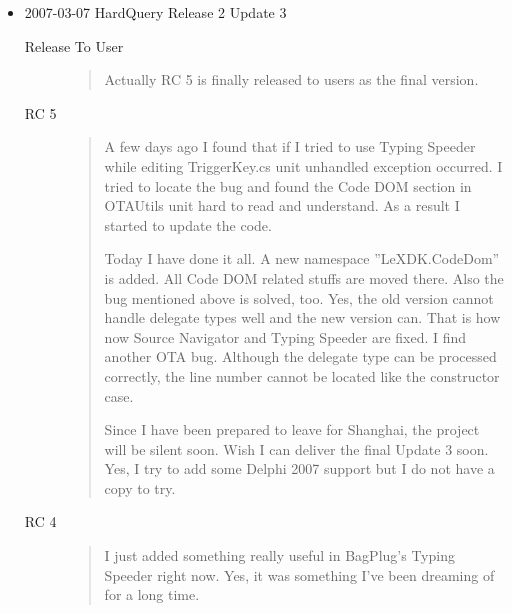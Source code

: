 \begin{itemize}
  \item 2007-03-07 HardQuery Release 2 Update 3
  \begin{description}
	\item[Release To User]
	\begin{quotation}
	Actually RC 5 is finally released to users as the final version.
	\end{quotation}
    \item[RC 5]
    \begin{quotation}
          A few days ago I found that if I tried to use Typing Speeder while editing
          TriggerKey.cs unit unhandled exception occurred. I tried to locate the
          bug and found the Code DOM section in OTAUtils unit hard to read and
          understand. As a result I started to update the code.

          Today I have done it all. A new namespace ''LeXDK.Co\-de\-Dom'' is added.
          All Code DOM related stuffs are moved there. Also the bug mentioned
          above is solved, too. Yes, the old version cannot handle delegate
          types well and the new version can. That is how now Source Navigator
          and Typing Speeder are fixed. I find another OTA bug. Although the
          delegate type can be processed correctly, the line number cannot be
          located like the constructor case.

          Since I have been prepared to leave for Shanghai, the project will be
          silent soon. Wish I can deliver the final Update 3 soon. Yes, I try
          to add some Delphi 2007 support but I do not have a copy to try.
    \end{quotation}
    \item[RC 4]
    \begin{quotation}
          I just added something really useful in BagPlug's Typing Speeder right
          now. Yes, it was something I've been dreaming of for a long time.


\end{quotation}
\end{description}
\end{itemize}
